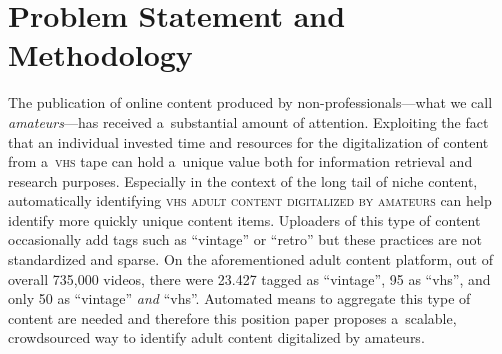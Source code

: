 \documentclass[runningheads,a4paper]{llncs}
\begin{document}
\section{Problem Statement and Methodology}
\vspace{-0.9em}
The publication of online content produced by
non-professionals---what we call \emph{amateurs}---has
received a~substantial amount of attention.
Exploiting the fact that an individual invested time and resources for the
digitalization of content from a~{\scshape vhs} tape can hold a~unique value
both for information retrieval and research purposes.
Especially in the context of the long tail of niche content,
automatically identifying {\scshape vhs adult content digitalized by amateurs}
can help identify more quickly unique content items.
Uploaders of this type of content occasionally add tags
such as ``vintage'' or ``retro'' but these practices are not standardized and sparse.
On the aforementioned adult content platform, out of overall 735,000 videos,
there were 23.427 tagged as ``vintage'', 95 as ``vhs'',
and only 50 as ``vintage'' \emph{and} ``vhs''.
Automated means to aggregate this type of content are needed
and therefore this position paper proposes a~scalable, crowdsourced way
to identify adult content digitalized by amateurs.
\end{document}
